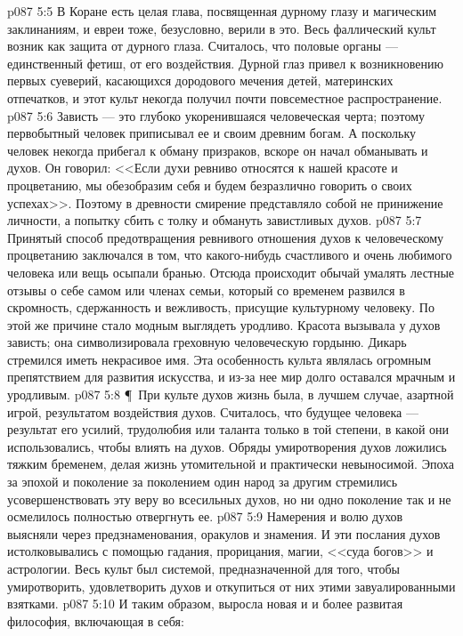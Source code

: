 \vs p087 5:5 В Коране есть целая глава, посвященная дурному глазу и магическим заклинаниям, и евреи тоже, безусловно, верили в это. Весь фаллический культ возник как защита от дурного глаза. Считалось, что половые органы --- единственный фетиш, от его воздействия. Дурной глаз привел к возникновению первых суеверий, касающихся дородового мечения детей, материнских отпечатков, и этот культ некогда получил почти повсеместное распространение.
\vs p087 5:6 Зависть --- это глубоко укоренившаяся человеческая черта; поэтому первобытный человек приписывал ее и своим древним богам. А поскольку человек некогда прибегал к обману призраков, вскоре он начал обманывать и духов. Он говорил: <<Если духи ревниво относятся к нашей красоте и процветанию, мы обезобразим себя и будем безразлично говорить о своих успехах>>. Поэтому в древности смирение представляло собой не принижение личности, а попытку сбить с толку и обмануть завистливых духов.
\vs p087 5:7 Принятый способ предотвращения ревнивого отношения духов к человеческому процветанию заключался в том, что какого\hyp{}нибудь счастливого и очень любимого человека или вещь осыпали бранью. Отсюда происходит обычай умалять лестные отзывы о себе самом или членах семьи, который со временем развился в скромность, сдержанность и вежливость, присущие культурному человеку. По этой же причине стало модным выглядеть уродливо. Красота вызывала у духов зависть; она символизировала греховную человеческую гордыню. Дикарь стремился иметь некрасивое имя. Эта особенность культа являлась огромным препятствием для развития искусства, и из\hyp{}за нее мир долго оставался мрачным и уродливым.
\vs p087 5:8 \P\ При культе духов жизнь была, в лучшем случае, азартной игрой, результатом воздействия духов. Считалось, что будущее человека --- результат его усилий, трудолюбия или таланта только в той степени, в какой они использовались, чтобы влиять на духов. Обряды умиротворения духов ложились тяжким бременем, делая жизнь утомительной и практически невыносимой. Эпоха за эпохой и поколение за поколением один народ за другим стремились усовершенствовать эту веру во всесильных духов, но ни одно поколение так и не осмелилось полностью отвергнуть ее.
\vs p087 5:9 Намерения и волю духов выясняли через предзнаменования, оракулов и знамения. И эти послания духов истолковывались с помощью гадания, прорицания, магии, <<суда богов>> и астрологии. Весь культ был системой, предназначенной для того, чтобы умиротворить, удовлетворить духов и откупиться от них этими завуалированными взятками.
\vs p087 5:10 И таким образом, выросла новая и и более развитая философия, включающая в себя:
